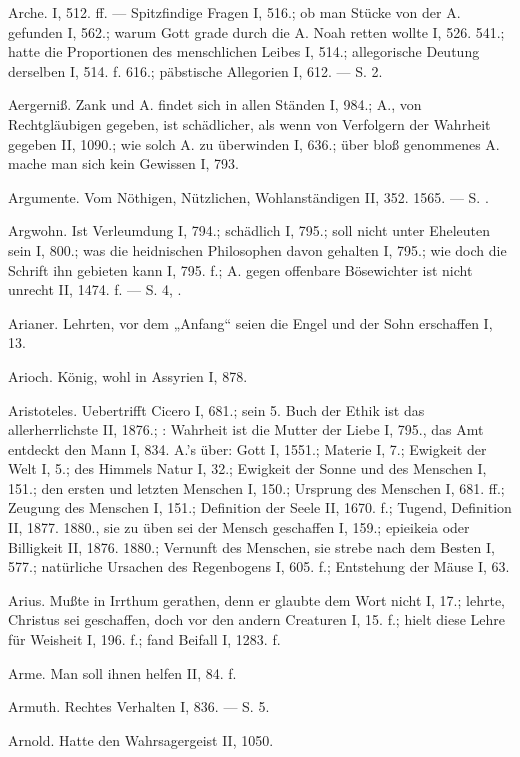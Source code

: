 Arche. I, 512. ff. — Spitzfindige Fragen I, 516.; ob man Stücke von der A. gefunden I, 562.; warum Gott grade durch die A. Noah retten wollte I, 526. 541.; hatte die Proportionen des menschlichen Leibes I, 514.; allegorische Deutung derselben I, 514. f. 616.; päbstische Allegorien I, 612. — S.  2.

Aergerniß. Zank und A. findet sich in allen Ständen I, 984.; A., von Rechtgläubigen gegeben, ist schädlicher, als wenn von Verfolgern der Wahrheit gegeben II, 1090.; wie solch A. zu überwinden I, 636.; über bloß genommenes A. mache man sich kein Gewissen I, 793.

Argumente. Vom Nöthigen, Nützlichen, Wohlanständigen II, 352. 1565. — S. .

Argwohn. Ist Verleumdung I, 794.; schädlich I, 795.; soll nicht unter Eheleuten sein I, 800.; was die heidnischen Philosophen davon gehalten I, 795.; wie doch die Schrift ihn gebieten kann I, 795. f.; A. gegen offenbare Bösewichter ist nicht unrecht II, 1474. f. — S.  4, .

Arianer. Lehrten, vor dem „Anfang“ seien die Engel und der Sohn erschaffen I, 13.

Arioch. König, wohl in Assyrien I, 878.

Aristoteles. Uebertrifft Cicero I, 681.; sein 5. Buch der Ethik ist das allerherrlichste II, 1876.; : Wahrheit ist die Mutter der Liebe I, 795., das Amt entdeckt den Mann I, 834. A.’s  über: Gott I, 1551.; Materie I, 7.; Ewigkeit der Welt I, 5.; des Himmels Natur I, 32.; Ewigkeit der Sonne und des Menschen I, 151.; den ersten und letzten Menschen I, 150.; Ursprung des Menschen I, 681. ff.; Zeugung des Menschen I, 151.; Definition der Seele II, 1670. f.; Tugend, Definition II, 1877. 1880., sie zu üben sei der Mensch geschaffen I, 159.; epieikeia oder Billigkeit II, 1876. 1880.; Vernunft des Menschen, sie strebe nach dem Besten I, 577.; natürliche Ursachen des Regenbogens I, 605. f.; Entstehung der Mäuse I, 63.

Arius. Mußte in Irrthum gerathen, denn er glaubte dem Wort nicht I, 17.; lehrte, Christus sei geschaffen, doch vor den andern Creaturen I, 15. f.; hielt diese Lehre für Weisheit I, 196. f.; fand Beifall I, 1283. f.

Arme. Man soll ihnen helfen II, 84. f.

Armuth. Rechtes Verhalten I, 836. — S.  5.

Arnold. Hatte den Wahrsagergeist II, 1050.

